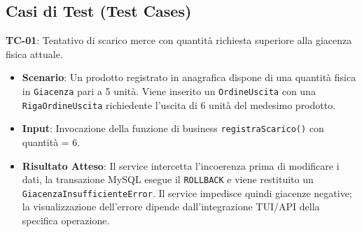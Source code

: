\documentclass[a4paper,12pt]{article}
\begin{document}
\subsection{Casi di Test (Test Cases)}
\textbf{TC-01}: Tentativo di scarico merce con quantità richiesta superiore alla giacenza fisica attuale.
\begin{itemize}
    \item \textbf{Scenario}: Un prodotto registrato in anagrafica dispone di una quantità fisica in \texttt{Giacenza} pari a 5 unità. Viene inserito un \texttt{OrdineUscita} con una \texttt{RigaOrdineUscita} richiedente l'uscita di 6 unità del medesimo prodotto.
    \item \textbf{Input}: Invocazione della funzione di business \texttt{registraScarico()} con quantità = 6.
    \item \textbf{Risultato Atteso}: Il service intercetta l'incoerenza prima di modificare i dati, la transazione MySQL esegue il \texttt{ROLLBACK} e viene restituito un \texttt{GiacenzaInsufficienteError}. Il service impedisce quindi giacenze negative; la visualizzazione dell'errore dipende dall'integrazione TUI/API della specifica operazione.
\end{itemize}
\end{document}
